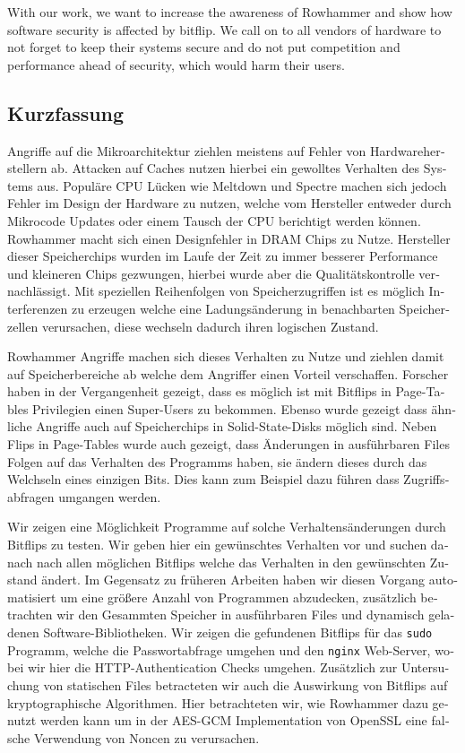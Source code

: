 With our work, we want to increase the awareness of Rowhammer and show how
software security is affected by bitflip. We call on to all vendors of hardware
to not forget to keep their systems secure and do not put competition and
performance ahead of security, which would harm their users.
\cleardoublepage
{}
{}
\begin{otherlanguage}{ngerman}
\chapter*{Kurzfassung}
\label{cha:kurzfassung}

Angriffe auf die Mikroarchitektur ziehlen meistens auf Fehler von
Hardwareherstellern ab. Attacken auf Caches nutzen hierbei ein gewolltes
Verhalten des Systems aus. Populäre CPU Lücken wie Meltdown und Spectre machen
sich jedoch Fehler im Design der Hardware zu nutzen, welche vom Hersteller
entweder durch Mikrocode Updates oder einem Tausch der CPU berichtigt werden
können. Rowhammer macht sich einen Designfehler in DRAM Chips zu Nutze.
Hersteller dieser Speicherchips wurden im Laufe der Zeit zu immer besserer
Performance und kleineren Chips gezwungen, hierbei wurde aber die
Qualitätskontrolle vernachlässigt. Mit speziellen Reihenfolgen von
Speicherzugriffen ist es möglich Interferenzen zu erzeugen welche eine
Ladungsänderung in benachbarten Speicherzellen verursachen, diese wechseln
dadurch ihren logischen Zustand.

Rowhammer Angriffe machen sich dieses Verhalten zu Nutze und ziehlen damit auf
Speicherbereiche ab welche dem Angriffer einen Vorteil verschaffen. Forscher
haben in der Vergangenheit gezeigt, dass es möglich ist mit Bitflips in
Page-Tables Privilegien einen Super-Users zu bekommen. Ebenso wurde gezeigt
dass ähnliche Angriffe auch auf Speicherchips in Solid-State-Disks möglich
sind. Neben Flips in Page-Tables wurde auch gezeigt, dass Änderungen in
ausführbaren Files Folgen auf das Verhalten des Programms haben, sie ändern
dieses durch das Welchseln eines einzigen Bits. Dies kann zum Beispiel dazu
führen dass Zugriffsabfragen umgangen werden.

Wir zeigen eine Möglichkeit Programme auf solche Verhaltensänderungen durch
Bitflips zu testen. Wir geben hier ein gewünschtes Verhalten vor und suchen
danach nach allen möglichen Bitflips welche das Verhalten in den gewünschten
Zustand ändert. Im Gegensatz zu früheren Arbeiten haben wir diesen Vorgang
automatisiert um eine größere Anzahl von Programmen abzudecken, zusätzlich
betrachten wir den Gesammten Speicher in ausführbaren Files und dynamisch
geladenen Software-Bibliotheken. Wir zeigen die gefundenen Bitflips für das
\texttt{sudo} Programm, welche die Passwortabfrage umgehen und den
\texttt{nginx} Web-Server, wobei wir hier die HTTP-Authentication Checks
umgehen. Zusätzlich zur Untersuchung von statischen Files betracteten wir auch
die Auswirkung von Bitflips auf kryptographische Algorithmen. Hier betrachteten
wir, wie Rowhammer dazu genutzt werden kann um in der AES-GCM Implementation von
OpenSSL eine falsche Verwendung von Noncen zu verursachen.


\end{otherlanguage}
